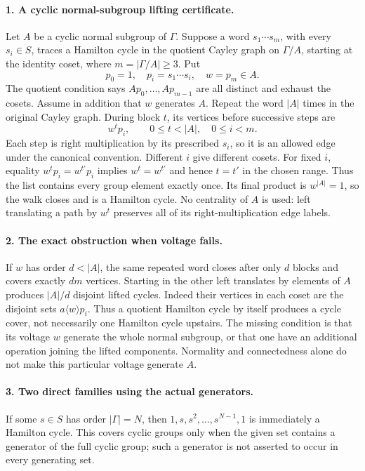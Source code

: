 \documentclass[11pt,a4paper]{article}
\begin{document}
\paragraph{1. A cyclic normal-subgroup lifting certificate.}
Let $A$ be a cyclic normal subgroup of $\Gamma$. Suppose a word
$s_1\cdots s_m$, with every $s_i\in S$, traces a Hamilton cycle in
the quotient Cayley graph on $\Gamma/A$, starting at the identity
coset, where $m=|\Gamma/A|\ge3$. Put
\[
 p_0=1,\quad p_i=s_1\cdots s_i,\quad w=p_m\in A.
\]
The quotient condition says $Ap_0,\ldots,Ap_{m-1}$ are all distinct
and exhaust the cosets. Assume in addition that $w$ generates $A$.
Repeat the word $|A|$ times in the original Cayley graph. During
block $t$, its vertices before successive steps are
\[
 w^t p_i,\qquad 0\le t<|A|,\quad 0\le i<m.
\]
Each step is right multiplication by its prescribed $s_i$, so it
is an allowed edge under the canonical convention. Different $i$
give different cosets. For fixed $i$, equality
$w^t p_i=w^{t'}p_i$ implies $w^t=w^{t'}$ and hence $t=t'$ in
the chosen range. Thus the list contains every group element exactly
once. Its final product is $w^{|A|}=1$, so the walk closes and
is a Hamilton cycle. No centrality of $A$ is used: left translating
a path by $w^t$ preserves all of its right-multiplication edge labels.

\paragraph{2. The exact obstruction when voltage fails.}
If $w$ has order $d<|A|$, the same repeated word closes after only
$d$ blocks and covers exactly $dm$ vertices. Starting in the other
left translates by elements of $A$ produces $|A|/d$ disjoint lifted
cycles. Indeed their vertices in each coset are the disjoint sets
$a\langle w\rangle p_i$. Thus a quotient Hamilton cycle by itself
produces a cycle cover, not necessarily one Hamilton cycle upstairs.
The missing condition is that its voltage $w$ generate the whole
normal subgroup, or that one have an additional operation joining the
lifted components. Normality and connectedness alone do not make this
particular voltage generate $A$.

\paragraph{3. Two direct families using the actual generators.}
If some $s\in S$ has order $|\Gamma|=N$, then
$1,s,s^2,\ldots,s^{N-1},1$ is immediately a Hamilton cycle. This
covers cyclic groups only when the given set contains a generator
of the full cyclic group; such a generator is not asserted to occur
in every generating set.
\end{document}
